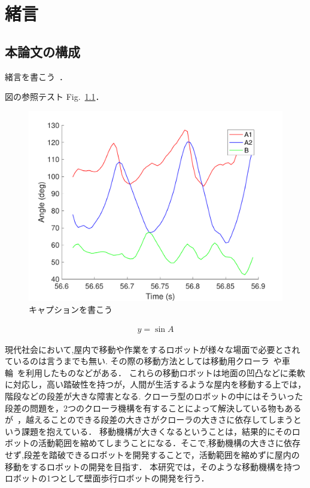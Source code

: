 
\chapter{緒言}
\label{Chapter1}

\section{本論文の構成}\label{Sec:sub_introduction}

緒言を書こう~\cite{bibtest}．

図の参照テスト Fig.~\ref{fig:test}．%


\begin{figure}[tb]
    \centering 
     \includegraphics[width=\columnwidth]{./figure/testfig.pdf}
     \caption{キャプションを書こう}
     \label{fig:test}
\end{figure}

\begin{align}
    y=\sin{A}
    \label{eq:test}
\end{align}


現代社会において,屋内で移動や作業をするロボットが様々な場面で必要とされているのは言うまでも無い.
その際の移動方法としては移動用クローラ~\cite{小柳栄次2010サブクローラを持つレスキューロボット}や車輪~\cite{尾崎功一20082p2}を利用したものなどがある．
これらの移動ロボットは地面の凹凸などに柔軟に対応し，高い踏破性を持つが，人間が生活するような屋内を移動する上では，階段などの段差が大きな障害となる.
クローラ型のロボットの中にはそういった段差の問題を，2つのクローラ機構を有することによって解決している物もあるが~\cite{小柳栄次2010サブクローラを持つレスキューロボット}，越えることのできる段差の大きさがクローラの大きさに依存してしまうという課題を抱えている．
移動機構が大きくなるということは，結果的にそのロボットの活動範囲を縮めてしまうことになる．そこで,移動機構の大きさに依存せず,段差を踏破できるロボットを開発することで，活動範囲を縮めずに屋内の移動をするロボットの開発を目指す．
本研究では，そのような移動機構を持つロボットの1つとして壁面歩行ロボットの開発を行う．

